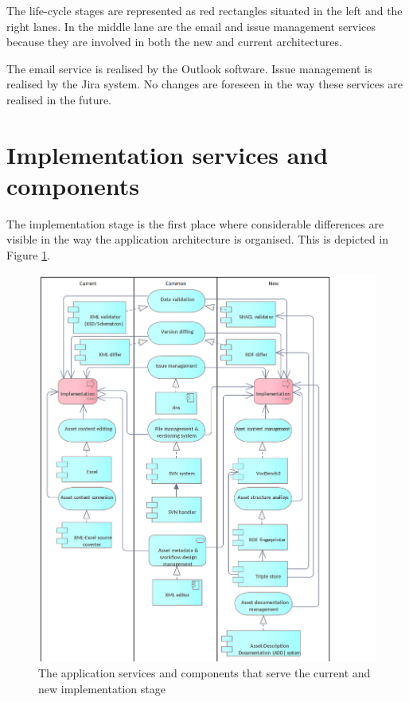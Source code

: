 	The life-cycle stages are represented as red rectangles situated in the left and the right lanes. In the middle lane are the email and issue management services because they are involved in both the new and current architectures. 
	
	The email service is realised by the Outlook software. Issue management is realised by the Jira system. No changes are foreseen in the way these services are realised in the future. 

	\section{Implementation services and components}
	\label{sec:implementation-application}	
	
	The implementation stage is the first place where considerable differences are visible in the way the application architecture is organised. This is depicted in Figure \ref{fig:application-implementation}.
	
	\begin{figure}[!h]
		\centering
		\includegraphics[width=.9\textwidth]{images/application/Implementation v3.png}
		\caption{The application services and components that serve the current and new implementation stage}
		\label{fig:application-implementation}
	\end{figure}
	

